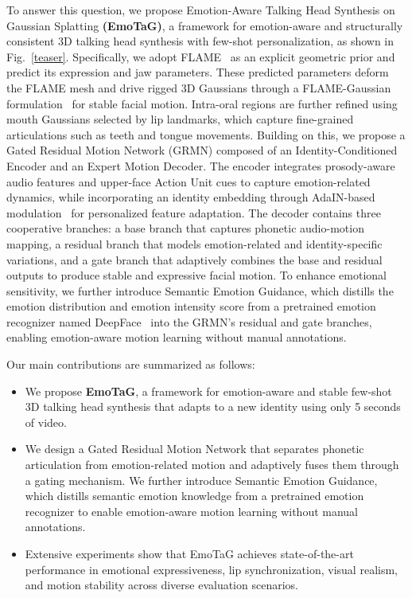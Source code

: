 To answer this question, we propose Emotion-Aware Talking Head Synthesis on Gaussian Splatting \textbf{(EmoTaG)}, a framework for emotion-aware and structurally consistent 3D talking head synthesis with few-shot personalization, as shown in Fig.~\ref{teaser}.
Specifically, we adopt FLAME~\cite{li2017learning} as an explicit geometric prior and predict its expression and jaw parameters. These predicted parameters deform the FLAME mesh and drive rigged 3D Gaussians through a FLAME-Gaussian formulation~\cite{qian2024gaussianavatars} for stable facial motion. Intra-oral regions are further refined using mouth Gaussians selected by lip landmarks, which capture fine-grained articulations such as teeth and tongue movements.
Building on this, we propose a Gated Residual Motion Network (GRMN) composed of an Identity-Conditioned Encoder and an Expert Motion Decoder. The encoder integrates prosody-aware audio features and upper-face Action Unit cues to capture emotion-related dynamics, while incorporating an identity embedding through AdaIN-based modulation~\cite{huang2017arbitrary, karras2019style} for personalized feature adaptation. The decoder contains three cooperative branches: a base branch that captures phonetic audio-motion mapping, a residual branch that models emotion-related and identity-specific variations, and a gate branch that adaptively combines the base and residual outputs to produce stable and expressive facial motion. To enhance emotional sensitivity, we further introduce Semantic Emotion Guidance, which distills the emotion distribution and emotion intensity score from a pretrained emotion recognizer named DeepFace~\cite{serengil2024lightface} into the GRMN’s residual and gate branches, enabling emotion-aware motion learning without manual annotations.

Our main contributions are summarized as follows:
\begin{itemize}
\item We propose \textbf{EmoTaG}, a framework for emotion-aware and stable few-shot 3D talking head synthesis that adapts to a new identity using only 5 seconds of video.
\item We design a Gated Residual Motion Network that separates phonetic articulation from emotion-related motion and adaptively fuses them through a gating mechanism. We further introduce Semantic Emotion Guidance, which distills semantic emotion knowledge from a pretrained emotion recognizer to enable emotion-aware motion learning without manual annotations.
\item Extensive experiments show that EmoTaG achieves state-of-the-art performance in emotional expressiveness, lip synchronization, visual realism, and motion stability across diverse evaluation scenarios.
\end{itemize}

